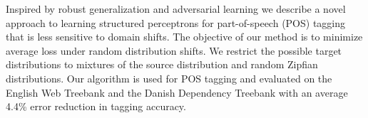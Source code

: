 Inspired by robust generalization and adversarial learning we describe a novel approach to learning structured perceptrons for part-of-speech (POS) tagging
 that is less sensitive to domain shifts. The objective of our method is to
 minimize average loss under random distribution shifts. We restrict the
 possible target distributions to mixtures of the source distribution and random
 Zipfian distributions. Our algorithm is used for POS tagging and evaluated on
 the English Web Treebank and the Danish Dependency Treebank with an average
 4.4\% error reduction in tagging accuracy.

